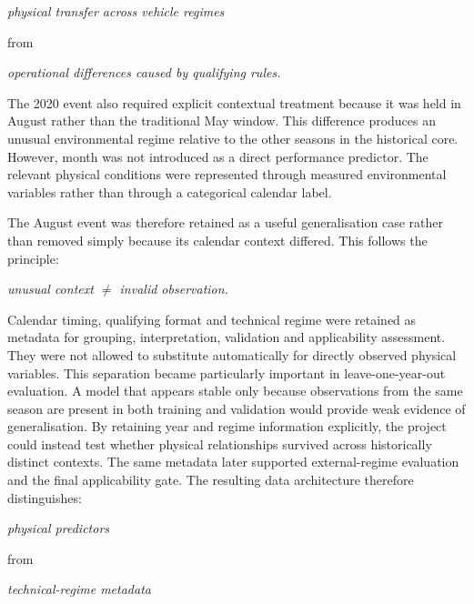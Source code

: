 \begin{center}\textit{physical transfer across vehicle regimes}\end{center}

from

\begin{center}\textit{operational differences caused by qualifying rules.}\end{center}

The 2020 event also required explicit contextual treatment because it was held in August rather than the traditional May window. This difference produces an unusual environmental regime relative to the other seasons in the historical core. However, month was not introduced as a direct performance predictor. The relevant physical conditions were represented through measured environmental variables rather than through a categorical calendar label.

The August event was therefore retained as a useful generalisation case rather than removed simply because its calendar context differed. This follows the principle:

\begin{center}\textit{unusual context \ensuremath{\neq} invalid observation.}\end{center}

Calendar timing, qualifying format and technical regime were retained as metadata for grouping, interpretation, validation and applicability assessment. They were not allowed to substitute automatically for directly observed physical variables. This separation became particularly important in leave-one-year-out evaluation. A model that appears stable only because observations from the same season are present in both training and validation would provide weak evidence of generalisation. By retaining year and regime information explicitly, the project could instead test whether physical relationships survived across historically distinct contexts. The same metadata later supported external-regime evaluation and the final applicability gate. The resulting data architecture therefore distinguishes:

\begin{center}\textit{physical predictors}\end{center}

from

\begin{center}\textit{technical-regime metadata}\end{center}

